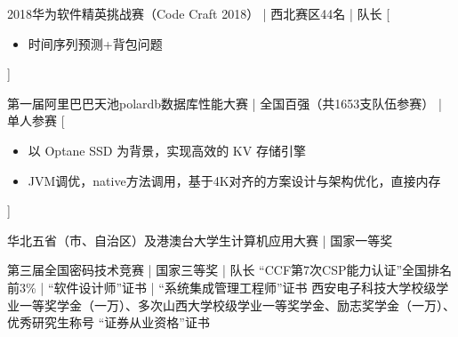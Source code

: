 \documentclass[zh]{resume}
\begin{document}
\begin{entries}

    {2018华为软件精英挑战赛（Code Craft 2018） | 西北赛区44名 | 队长}%
    [\begin{itemize}
      \item{\icon{\faFlag}} 时间序列预测+背包问题\quad {}
    \end{itemize}]%

    {第一届阿里巴巴天池polardb数据库性能大赛 | 全国百强（共1653支队伍参赛） | 单人参赛}%
    [\begin{itemize}
      \item{\icon{\faFlag}} 以 Optane SSD 为背景，实现高效的 KV 存储引擎
      \item{\icon{\faFlag}} JVM调优，native方法调用，基于4K对齐的方案设计与架构优化，直接内存
    \end{itemize}]%

    {华北五省（市、自治区）及港澳台大学生计算机应用大赛 | 国家一等奖 }%
	

    {第三届全国密码技术竞赛 | 国家三等奖 | 队长 \quad {}}%
    {“CCF第7次CSP能力认证”全国排名前3\% | “软件设计师”证书 | “系统集成管理工程师”证书}
    {西安电子科技大学校级学业一等奖学金（一万）、多次山西大学校级学业一等奖学金、励志奖学金（一万）、优秀研究生称号}
    {“证券从业资格”证书}
\end{entries}
\end{document}
